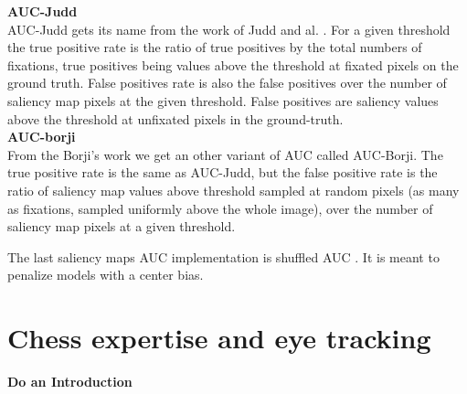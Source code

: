 \textbf{AUC-Judd}\\

AUC-Judd gets its name from the work of Judd and al. \cite{judd,Judd_2012,metricsreview}. For a given threshold the true positive rate is the ratio of true positives by the total numbers of fixations, true positives being values above the threshold at fixated pixels on the ground truth. False positives rate is also the false positives over the number of saliency map pixels at the given threshold. False positives are saliency values above the threshold at unfixated pixels in the ground-truth. \\

\textbf{AUC-borji}\\

From the Borji's work \cite{6751224} we get an other variant of AUC called AUC-Borji. The true positive rate is the same as AUC-Judd, but the false positive rate is the ratio of saliency map values above threshold sampled at random pixels (as many as fixations, sampled uniformly above the whole image), over the number of saliency map pixels at a given threshold. 


The last saliency maps AUC implementation is shuffled AUC \cite{sAUC}. It is meant to penalize models with a center bias.



\section{Chess expertise and eye tracking}\label{Chess expertise and eye tracking}


\textbf{Do an Introduction}


